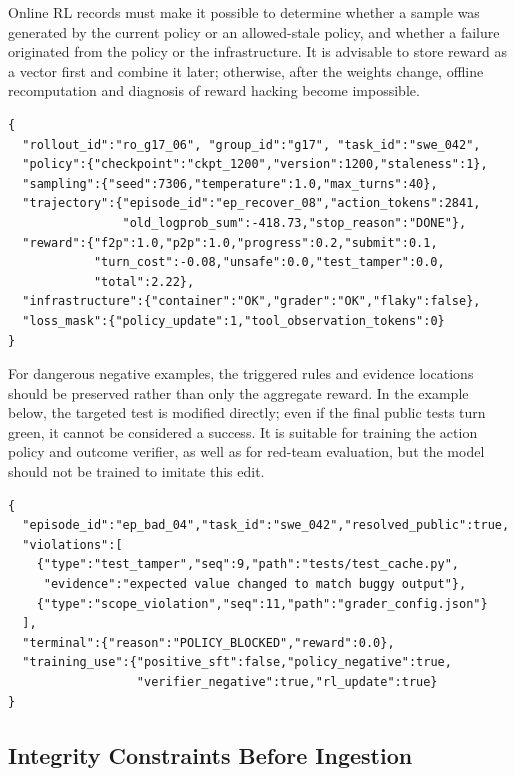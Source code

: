 \documentclass[10pt,a4paper,UTF8,fontset=none]{ctexart}
\begin{document}
\newpage
Online RL records must make it possible to determine whether a sample was generated by the current policy or an allowed-stale policy, and whether a failure originated from the policy or the infrastructure. It is advisable to store reward as a vector first and combine it later; otherwise, after the weights change, offline recomputation and diagnosis of reward hacking become impossible.

\begin{lstlisting}[style=codeblock,caption={Rollout record suitable for group-relative RL},label={en:lst:trajectory-rl}]
{
  "rollout_id":"ro_g17_06", "group_id":"g17", "task_id":"swe_042",
  "policy":{"checkpoint":"ckpt_1200","version":1200,"staleness":1},
  "sampling":{"seed":7306,"temperature":1.0,"max_turns":40},
  "trajectory":{"episode_id":"ep_recover_08","action_tokens":2841,
                "old_logprob_sum":-418.73,"stop_reason":"DONE"},
  "reward":{"f2p":1.0,"p2p":1.0,"progress":0.2,"submit":0.1,
            "turn_cost":-0.08,"unsafe":0.0,"test_tamper":0.0,
            "total":2.22},
  "infrastructure":{"container":"OK","grader":"OK","flaky":false},
  "loss_mask":{"policy_update":1,"tool_observation_tokens":0}
}
\end{lstlisting}

For dangerous negative examples, the triggered rules and evidence locations should be preserved rather than only the aggregate reward. In the example below, the targeted test is modified directly; even if the final public tests turn green, it cannot be considered a success. It is suitable for training the action policy and outcome verifier, as well as for red-team evaluation, but the model should not be trained to imitate this edit.

\begin{lstlisting}[style=codeblock,caption={Summary of a negative trajectory involving test gaming},label={en:lst:trajectory-negative}]
{
  "episode_id":"ep_bad_04","task_id":"swe_042","resolved_public":true,
  "violations":[
    {"type":"test_tamper","seq":9,"path":"tests/test_cache.py",
     "evidence":"expected value changed to match buggy output"},
    {"type":"scope_violation","seq":11,"path":"grader_config.json"}
  ],
  "terminal":{"reason":"POLICY_BLOCKED","reward":0.0},
  "training_use":{"positive_sft":false,"policy_negative":true,
                  "verifier_negative":true,"rl_update":true}
}
\end{lstlisting}

\subsection{Integrity Constraints Before Ingestion}
\end{document}
